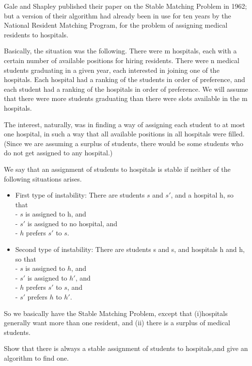 \documentclass[a4paper]{article}
\begin{document}
\begin{adjustwidth}{1cm}{1cm}
	Gale and Shapley published their paper on the Stable Matching Problem in 1962; but a version of their algorithm had already been in use for ten years by the National Resident Matching Program, for the problem of assigning medical residents to hospitals.
	\par Basically, the situation was the following. There were m hospitals, each with a certain number of available positions for hiring residents. There were n medical students graduating in a given year, each interested in joining one of the hospitals. Each hospital had a ranking of the students in order of preference, and each student had a ranking of the hospitals in order of preference. We will assume that there were more students graduating than there were slots available in the m hospitals.
	\par The interest, naturally, was in finding a way of assigning each student to at most one hospital, in such a way that all available positions in all hospitals were filled. (Since we are assuming a surplus of students, there would be some students who do not get assigned to any hospital.)
	\par We say that an assignment of students to hospitals is stable if neither of the following situations arises.
	\begin{itemize}
		\item First type of instability: There are students $s$ and $s'$, and a hospital h, so that \\
		      -  $s$ is assigned to h, and \\
		      -  $s'$ is assigned to no hospital, and \\
		      -  $h$ prefers $s'$ to $s$.
		\item Second type of instability: There are students s and s, and hospitals h and h, so that \\
		      -  $s$ is assigned to $h$, and \\
		      -  $s'$ is assigned to $h'$, and \\
		      -  $h$ prefers $s'$ to $s$, and \\
		      -  $s'$ prefers $h$ to $h'$.
	\end{itemize}
	So we basically have the Stable Matching Problem, except that (i)hospitals generally want more than one resident, and (ii) there is a surplus of medical students.
	\par Show that there is always a stable assignment of students to hospitals,and give an algorithm to find one.
\end{adjustwidth}
\end{document}
